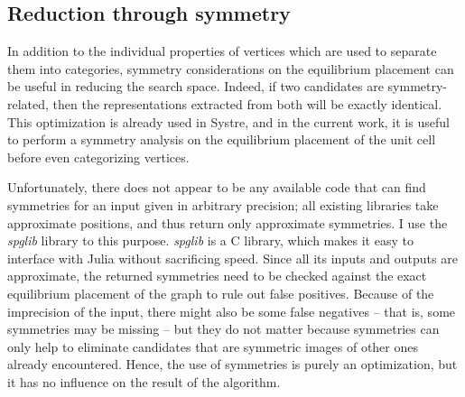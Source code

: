 \documentclass[main.tex]{subfiles}
\begin{document}
%

\subsection{Reduction through symmetry}
\label{symmetries}

In addition to the individual properties of vertices which are used to separate them into categories, symmetry considerations on the equilibrium placement can be useful in reducing the search space. Indeed, if two candidates are symmetry-related, then the representations extracted from both will be exactly identical. This optimization is already used in Systre, and in the current work, it is useful to perform a symmetry analysis on the equilibrium placement of the unit cell before even categorizing vertices.

Unfortunately, there does not appear to be any available code that can find symmetries for an input given in arbitrary precision; all existing libraries take approximate positions, and thus return only approximate symmetries. I use the \textit{spglib} library \autocite{spglib} to this purpose. \textit{spglib} is a C library, which makes it easy to interface with Julia without sacrificing speed. Since all its inputs and outputs are approximate, the returned symmetries need to be checked against the exact equilibrium placement of the graph to rule out false positives. Because of the imprecision of the input, there might also be some false negatives -- that is, some symmetries may be missing -- but they do not matter because symmetries can only help to eliminate candidates that are symmetric images of other ones already encountered. Hence, the use of symmetries is purely an optimization, but it has no influence on the result of the algorithm. %
\end{document}
